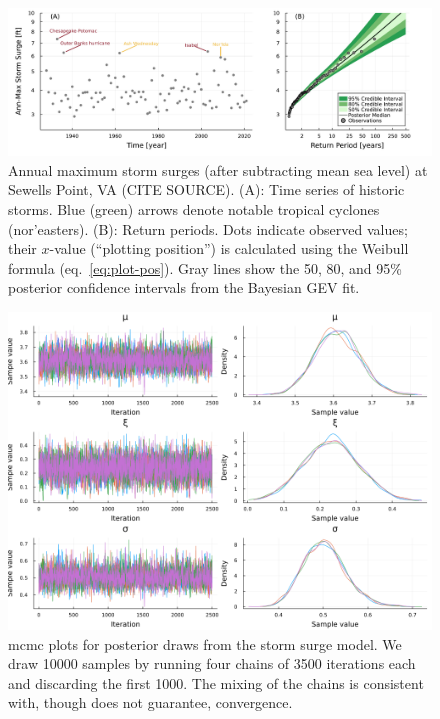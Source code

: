 \documentclass[12pt]{article}
\begin{document}
\begin{figure}
    \centering
    \includegraphics[width=\textwidth]{surge-obs-return}
    \caption{
        Annual maximum storm surges (after subtracting mean sea level) at Sewells Point, VA (CITE SOURCE). %
        (A):
        Time series of historic storms.
        Blue (green) arrows denote notable tropical cyclones (nor'easters).
        (B):
        Return periods.
        Dots indicate observed values; their $x$-value (``plotting position'') is calculated using the Weibull formula (eq.~\cref{eq:plot-pos}).
        Gray lines show the 50, 80, and 95\% posterior confidence intervals from the Bayesian GEV fit.
    }\label{fig:surge-obs-return}
\end{figure}

\begin{figure}
    \centering
    \includegraphics[width=\textwidth]{surge-posterior-chains}
    \caption{
        \Gls{mcmc} plots for posterior draws from the storm surge model.
        We draw \num{10000} samples by running four chains of \num{3500} iterations each and discarding the first \num{1000}.
        The mixing of the chains is consistent with, though does not guarantee, convergence.
    }\label{fig:surge-posterior-chains}
\end{figure}
\end{document}
